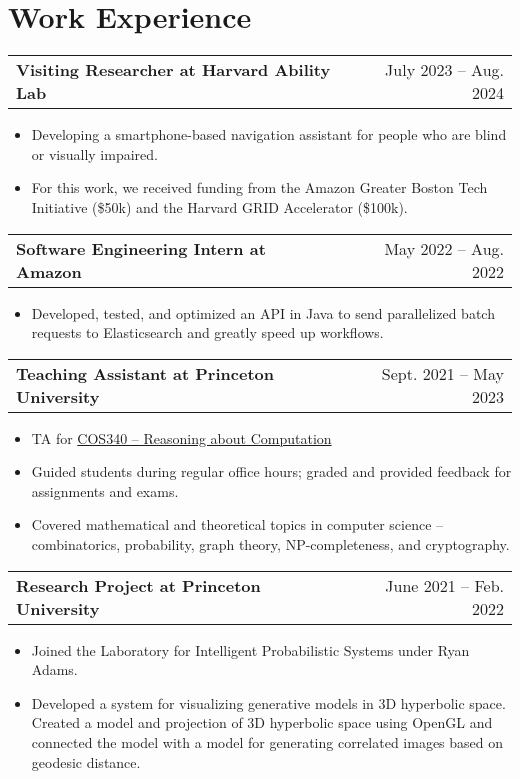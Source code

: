 \documentclass[a4paper,12pt]{article}
\makeatletter
\newenvironment{joblong}[2]
    {
    \begin{tabularx}{\linewidth}{@{}l X r@{}}
    \textbf{#1} & \hfill &  #2 \\[3.75pt]
    \end{tabularx}
    \begin{minipage}[t]{\linewidth}
    \begin{itemize}[nosep,after=\strut, leftmargin=2em, itemsep=3pt,label=--]
    }
    {
    \end{itemize}
    \end{minipage}    
    }
\makeatother
\begin{document}

\vspace{-10pt}
\section{Work Experience}
\begin{adjustwidth}{0.7em}{0pt}

\begin{joblong}{Visiting Researcher at Harvard Ability Lab}{July 2023 – Aug. 2024}
\item Developing a smartphone-based navigation assistant for people who are blind or visually impaired.
\item For this work, we received funding from the Amazon Greater Boston Tech Initiative (\$50k) and the Harvard GRID Accelerator (\$100k).
\end{joblong}

\begin{joblong}{Software Engineering Intern at Amazon}{May 2022 – Aug. 2022}
\item Developed, tested, and optimized an API in Java to send parallelized batch requests to Elasticsearch and greatly speed up workflows.
\end{joblong}

\begin{joblong}{Teaching Assistant at Princeton University}{Sept. 2021 – May 2023}
\item TA for \href{https://www.cs.princeton.edu/courses/archive/fall21/cos340/}{COS340 – Reasoning about Computation}
\item Guided students during regular office hours; graded and provided feedback for assignments and exams.
\item Covered mathematical and theoretical topics in computer science – combinatorics, probability, graph theory, NP-completeness, and cryptography.
\end{joblong}

\begin{joblong}{Research Project at Princeton University}{June 2021 – Feb. 2022}
\item Joined the Laboratory for Intelligent Probabilistic Systems under Ryan Adams.
\item Developed a system for visualizing generative models in 3D hyperbolic space. Created a model and projection of 3D hyperbolic space using OpenGL and connected the model with a model for generating correlated images based on geodesic distance.
\end{joblong}


\end{adjustwidth}
\end{document}
